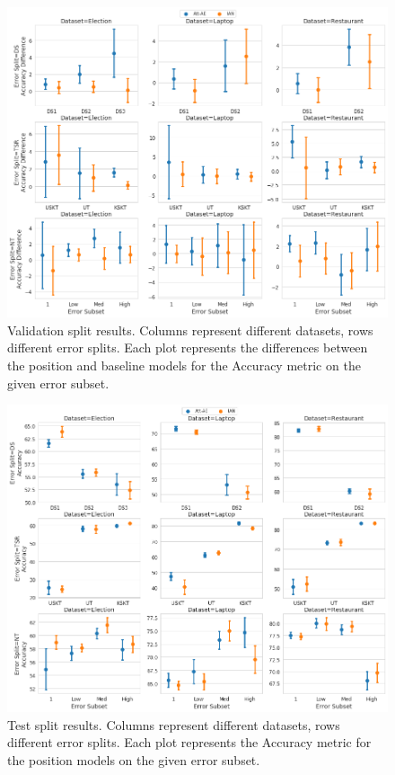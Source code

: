 \begin{figure}[h!]
    \centering
    \includegraphics[scale=0.42]{images/augmentation/methods_performance/Position_Encoding/position_split_difference_validation_results.png}
    \caption{Validation split results. Columns represent different datasets, rows different error splits. Each plot represents the differences between the position and baseline models for the Accuracy metric on the given error subset.}
    \label{fig:aug_position_split_difference_validation_results}
\end{figure}
\begin{figure}[h!]
    \centering
    \includegraphics[scale=0.42]{images/augmentation/methods_performance/Position_Encoding/position_split_overall_test_results.png}
    \caption{Test split results. Columns represent different datasets, rows different error splits. Each plot represents the Accuracy metric for the position models on the given error subset.}
    \label{fig:aug_position_split_overall_test_results}
\end{figure}
